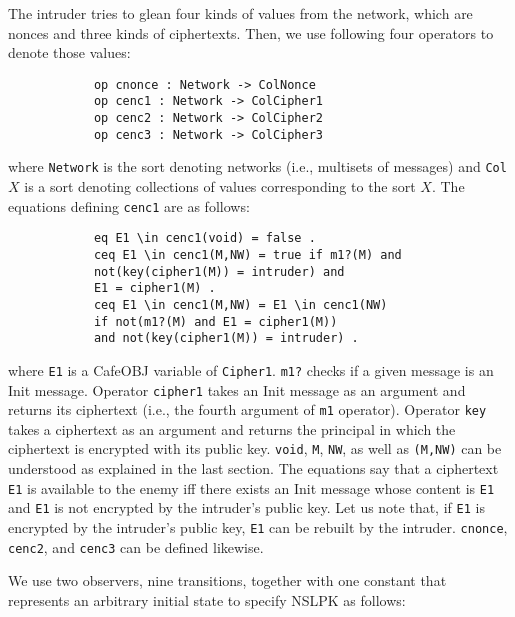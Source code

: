 \documentclass[10pt, conference, compsocconf]{IEEEtran}
\begin{document}
	The intruder tries to glean four kinds of values from the network, which are nonces and three kinds of ciphertexts. Then, we use following four operators to denote those values:
	
	\begin{small}
		\begin{verbatim}
			op cnonce : Network -> ColNonce
			op cenc1 : Network -> ColCipher1
			op cenc2 : Network -> ColCipher2
			op cenc3 : Network -> ColCipher3
		\end{verbatim}
	\end{small}
	
	\noindent
	where \verb!Network! is the sort denoting networks (i.e., multisets of messages) and \verb!Col!$X$ is a sort denoting collections of values corresponding to the sort $X$. 
	The equations defining \verb!cenc1! are as follows:
	
	\begin{small}
		\begin{verbatim}
			eq E1 \in cenc1(void) = false .
			ceq E1 \in cenc1(M,NW) = true if m1?(M) and 
			not(key(cipher1(M)) = intruder) and 
			E1 = cipher1(M) .
			ceq E1 \in cenc1(M,NW) = E1 \in cenc1(NW)
			if not(m1?(M) and E1 = cipher1(M)) 
			and not(key(cipher1(M)) = intruder) .
		\end{verbatim}
	\end{small}
	
	\noindent
	where \verb!E1! is a CafeOBJ variable of \verb!Cipher1!.
	\verb!m1?! checks if a given message is an Init message.
	Operator \verb!cipher1! takes an Init message as an argument and returns its ciphertext (i.e., the fourth argument of \verb!m1! operator).
	Operator \verb!key! takes a ciphertext as an argument and returns the principal in which the ciphertext is encrypted with its public key. 
	\verb!void!, \verb!M!, \verb!NW!, as well as \verb!(M,NW)! can be understood as explained in the last section.
	The equations say that a ciphertext \verb!E1! is available to the enemy iff there exists an Init message whose content is \verb!E1! and \verb!E1! is not encrypted by the intruder's public key. 
	Let us note that, if \verb!E1! is encrypted by the intruder's public key, \verb!E1! can be rebuilt by the intruder.
	\verb!cnonce!, \verb!cenc2!, and \verb!cenc3! can be defined likewise.
	
	We use two observers, nine transitions, together with one constant that represents an arbitrary initial state to specify NSLPK as follows:
	
\end{document}
